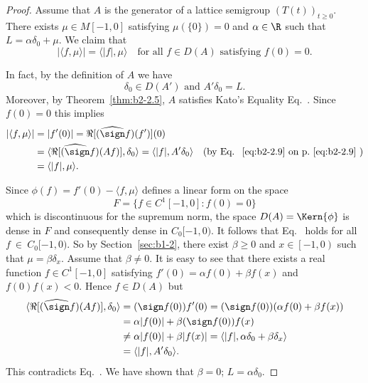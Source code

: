 \begin{proof}
Assume that $A$ is the generator of a lattice semigroup $(T(t))_{t \geq 0}$.
There exists $\mu \in M[-1,0]$ satisfying $\mu(\{0\}) = 0$ and $\alpha \in \R$ such that $L = \alpha\delta_{0} + \mu$.
We claim that
\begin{equation}\label{eq:b2-2.18}
|\langle f,\mu \rangle| = \langle |f|,\mu \rangle \quad \text{for all } f \in D(A) \text{ satisfying } f(0) = 0.
\end{equation}

In fact, by the definition of\/ $A$ we have
\begin{equation}\label{eq:b2-2.19}
\delta_{0} \in D(A') \text{ and } A'\delta_{0} = L.
\end{equation}
Moreover, by Theorem~\ref{thm:b2-2.5}, $A$ satisfies Kato's Equality Eq.~.
Since $f(0) = 0$ this implies
\begin{align*}
|\langle f,\mu \rangle| &= |f'(0)| = \Re[(\widehat{\sign} f)(f')](0) \\
&= \langle \Re[\widehat{(\sign} f)(Af)],\delta_{0} \rangle = \langle |f|,A'\delta_{0} \rangle \quad \text{(by Eq.~\myeqpageref{eq:b2-2.9})} \\
&= \langle |f|,\mu \rangle.
\end{align*}

Since $\phi(f) = f'(0) - \langle f,\mu \rangle$ defines a linear form on the space 
\[
F = \{f \in C^{1}[-1,0] \colon f(0) = 0\}
\]
 which is discontinuous for the supremum norm, the space $D(A) = \Kern{\phi}$ is dense in $F$ and consequently dense in $C_{0}[-1,0)$.
It follows that Eq.~ holds for all $f~\in~C_{0}[-1,0)$.
So by Section~\ref{sec:b1-2}, there exist $\beta \geq 0$ and $x \in \left[-1,0\right)$ such that $\mu = \beta\delta_{x}$.
Assume that $\beta \neq 0$.
It is easy to see that there exists a real function $f \in C^{1}[-1,0]$ satisfying $f'(0) = \alpha f(0) + \beta f(x)$ and $f(0)f(x) < 0$.
Hence $f \in D(A)$ but 
\begin{align*}
\langle \Re[(\widehat{\sign} f)(Af)],\delta_{0} \rangle 
	&= (\sign f(0))f'(0) 
	= (\sign f(0))(\alpha f(0) + \beta f(x))\\
	&= \alpha|f(0)| + \beta(\sign f(0))f(x) \\
	&\neq \alpha|f(0)| + \beta|f(x)| 
	= \langle |f|, \alpha\delta_{0} + \beta\delta_{x} \rangle \\ 
	&= \langle |f|,A'\delta_{0} \rangle.
\end{align*}
This contradicts Eq.~.
We have shown that $\beta = 0$; \ie  $L = \alpha\delta_{0}$.


\end{proof}

